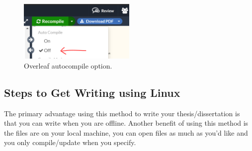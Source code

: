\documentclass[../Dissertation]{subfiles}
\begin{document}
    \begin{figure}[H]
        \centering
        \includegraphics[width=0.5\textwidth]
        {./Overleaf_autocompile}
        \caption{Overleaf autocompile option.}
        \label{fig:Overleaf_autocompile}
    \end{figure}
    
\subsection{Steps to Get Writing using Linux}
    The primary advantage using this method to write your thesis/dissertation
    is that you can write when you are offline.  Another benefit of using this
    method is the files are on your local machine, you can open files as much
    as you'd like and you only compile/update when you specify. \\
    
\end{document}
